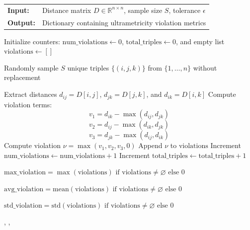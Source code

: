 \documentclass[]{Liebert_Author_revised}
\begin{document}
\begin{algorithm}[h]
\caption{Ultrametricity of a Distance Matrix}
\label{alg_ultrametricity_violations}
\noindent
\small
\begin{tabular}{p{1cm}p{7cm}}
\textbf{Input:}  & Distance matrix \(D \in \mathbb{R}^{n \times n}\), sample size \(S\), tolerance \(\epsilon\) \\
\textbf{Output:} & Dictionary containing ultrametricity violation metrics
\end{tabular}

\begin{algorithmic}[1]{}

\STATE Initialize counters: \(\text{num\_violations} \leftarrow 0\), \(\text{total\_triples} \leftarrow 0\), and empty list \(\text{violations} \leftarrow []\)

\STATE Randomly sample \(S\) unique triples \(\{(i, j, k)\}\) from \(\{1, \ldots, n\}\) without replacement

    \STATE Extract distances \(d_{ij} = D[i,j]\), \(d_{jk} = D[j,k]\), and \(d_{ik} = D[i,k]\)
    \STATE Compute violation terms:
    \[
    v_1 = d_{ik} - \max(d_{ij}, d_{jk})
    \]
    \[
    v_2 = d_{ij} - \max(d_{ik}, d_{jk})
    \]
    \[
    v_3 = d_{jk} - \max(d_{ij}, d_{ik})
    \]
    \STATE Compute violation \(\nu = \max(v_1, v_2, v_3, 0)\)
    \IF{\(\nu > \epsilon\)}
        \STATE Append \(\nu\) to \(\text{violations}\)
        \STATE Increment \(\text{num\_violations} \leftarrow \text{num\_violations} + 1\)
    \ENDIF
    \STATE Increment \(\text{total\_triples} \leftarrow \text{total\_triples} + 1\)
\ENDFOR


\STATE $\text{max\_violation} = \max(\text{violations}) \text{ if } \text{violations} \neq \varnothing \text{ else } 0$

\STATE $\text{avg\_violation} = \text{mean}(\text{violations}) \text{ if } \text{violations} \neq \varnothing \text{ else } 0$

\STATE $\text{std\_violation} = \text{std}(\text{violations}) \text{ if } \text{violations} \neq \varnothing \text{ else } 0$


\RETURN {}, , 

\end{algorithmic}
\end{algorithm}
\end{document}
